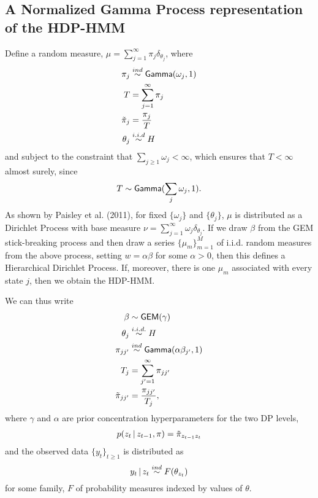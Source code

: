 \subsection{A Normalized Gamma Process representation of the HDP-HMM}
\label{sec:normalized-gamma}

Define a random measure, $\mu = \sum_{j=1}^{\infty} \pi_j
\delta_{\theta_j}$, where
\begin{align} \pi_j &\stackrel{ind}{\sim}
\mathsf{Gamma}(\omega_j,1) \label{eq:17}\\ T &= \sum_{j=1}^{\infty}
\pi_j \label{eq:18}\\ \tilde{\pi}_j &= \frac{\pi_j}{T} \label{eq:16}\\
\theta_j &\stackrel{i.i.d}{\sim} H \label{eq:19}
\end{align} and subject to the constraint that $\sum_{j\geq 1}
\omega_j < \infty$, which ensures that $T < \infty$ almost surely,
since
\begin{equation*} T \sim \mathsf{Gamma}(\sum_j \omega_j,1).
\end{equation*} As shown by Paisley et al. (2011), for fixed
$\{\omega_j\}$ and $\{\theta_j\}$, $\mu$ is distributed as a Dirichlet
Process with base measure $\nu = \sum_{j=1}^{\infty} \omega_j
\delta_{\theta_j}$.  If we draw $\beta$ from the GEM stick-breaking process
and then draw a series $\{\mu_m\}_{m=1}^M$ of i.i.d. random measures
from the above process, setting $w = \alpha\beta$ for some $\alpha >
0$, then this defines a Hierarchical Dirichlet Process.  If, moreover,
there is one $\mu_m$ associated with every state $j$, then we obtain
the HDP-HMM.

We can thus write
\begin{align} \beta &\sim \mathsf{GEM}(\gamma) \label{eq:20} \\ \theta_j
&\stackrel{i.i.d.}{\sim} H \label{eq:21}\\ \pi_{jj'}
&\stackrel{ind}{\sim} \mathsf{Gamma}(\alpha \beta_{j'},1) \label{eq:22}\\ T_j
&= \sum_{j'=1}^{\infty} \pi_{jj'} \\ \tilde{\pi}_{jj'} &=
\frac{\pi_{jj'}}{T_j} \label{eq:23},
\end{align} where $\gamma$ and $\alpha$ are prior concentration
hyperparameters for the two DP levels,
\begin{align}
  \label{eq:50} p(z_t \, \vert \, z_{t-1}, \pi) = \tilde{\pi}_{z_{t-1}z_t}
\end{align} and the observed data $\{y_t\}_{t\geq 1}$ is distributed
as
\begin{equation}
  \label{eq:24} y_t \, \vert \, z_t \stackrel{ind}{\sim} F(\theta_{z_t})
\end{equation} for some family, $F$ of probability measures indexed by
values of $\theta$.

